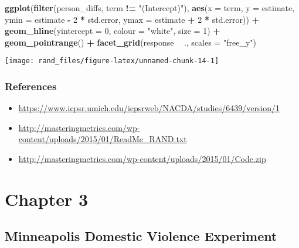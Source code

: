 \documentclass[]{book}
\newenvironment{Shaded}{\begin{snugshade}}{\end{snugshade}}
\newcommand{\KeywordTok}[1]{\textcolor[rgb]{0.13,0.29,0.53}{\textbf{#1}}}
\newcommand{\DataTypeTok}[1]{\textcolor[rgb]{0.13,0.29,0.53}{#1}}
\newcommand{\DecValTok}[1]{\textcolor[rgb]{0.00,0.00,0.81}{#1}}
\newcommand{\StringTok}[1]{\textcolor[rgb]{0.31,0.60,0.02}{#1}}
\newcommand{\OperatorTok}[1]{\textcolor[rgb]{0.81,0.36,0.00}{\textbf{#1}}}
\newcommand{\NormalTok}[1]{#1}
\providecommand{\tightlist}{%
  \setlength{\itemsep}{0pt}\setlength{\parskip}{0pt}}
\theoremstyle{definition}
\theoremstyle{definition}
\theoremstyle{definition}
\theoremstyle{remark}
\begin{document}
\begin{Shaded}
\begin{Highlighting}[]
\KeywordTok{ggplot}\NormalTok{(}\KeywordTok{filter}\NormalTok{(person_diffs, term }\OperatorTok{!=}\StringTok{ "(Intercept)"}\NormalTok{),}
              \KeywordTok{aes}\NormalTok{(}\DataTypeTok{x =}\NormalTok{ term, }\DataTypeTok{y =}\NormalTok{ estimate,}
                  \DataTypeTok{ymin =}\NormalTok{ estimate }\OperatorTok{-}\StringTok{ }\DecValTok{2} \OperatorTok{*}\StringTok{ }\NormalTok{std.error,}
                  \DataTypeTok{ymax =}\NormalTok{ estimate }\OperatorTok{+}\StringTok{ }\DecValTok{2} \OperatorTok{*}\StringTok{ }\NormalTok{std.error)) }\OperatorTok{+}
\StringTok{  }\KeywordTok{geom_hline}\NormalTok{(}\DataTypeTok{yintercept =} \DecValTok{0}\NormalTok{, }\DataTypeTok{colour =} \StringTok{"white"}\NormalTok{, }\DataTypeTok{size =} \DecValTok{1}\NormalTok{) }\OperatorTok{+}
\StringTok{  }\KeywordTok{geom_pointrange}\NormalTok{() }\OperatorTok{+}
\StringTok{  }\KeywordTok{facet_grid}\NormalTok{(response }\OperatorTok{~}\StringTok{ }\NormalTok{., }\DataTypeTok{scales =} \StringTok{"free_y"}\NormalTok{)}
\end{Highlighting}
\end{Shaded}

\begin{center}\texttt{[image: rand\_files/figure-latex/unnamed-chunk-14-1]} \end{center}

\section*{References}\label{references-1}

\begin{itemize}
\tightlist
\item
  \url{https://www.icpsr.umich.edu/icpsrweb/NACDA/studies/6439/version/1}
\item
  \url{http://masteringmetrics.com/wp-content/uploads/2015/01/ReadMe_RAND.txt}
\item
  \url{http://masteringmetrics.com/wp-content/uploads/2015/01/Code.zip}
\end{itemize}

\part{Chapter 3}\label{part-chapter-3}

\chapter{Minneapolis Domestic Violence
Experiment}\label{minneapolis-domestic-violence-experiment}
\end{document}

